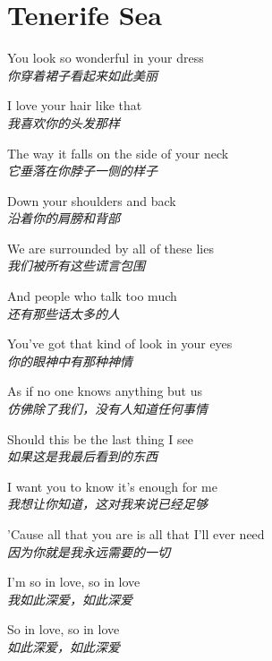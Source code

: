 \section{Tenerife Sea}

\thispagestyle{empty}


\begin{spacing}{1.5}
\begin{flushleft}
You look so wonderful in your dress\\
\textit{你穿着裙子看起来如此美丽}\lyricspace

I love your hair like that\\
\textit{我喜欢你的头发那样}\lyricspace

The way it falls on the side of your neck\\
\textit{它垂落在你脖子一侧的样子}\lyricspace

Down your shoulders and back\\
\textit{沿着你的肩膀和背部}\lyricspace

We are surrounded by all of these lies\\
\textit{我们被所有这些谎言包围}\lyricspace

And people who talk too much\\
\textit{还有那些话太多的人}\lyricspace

You've got that kind of look in your eyes\\
\textit{你的眼神中有那种神情}\lyricspace

As if no one knows anything but us\\
\textit{仿佛除了我们，没有人知道任何事情}\lyricspace

Should this be the last thing I see\\
\textit{如果这是我最后看到的东西}\lyricspace

I want you to know it's enough for me\\
\textit{我想让你知道，这对我来说已经足够}\lyricspace

'Cause all that you are is all that I'll ever need\\
\textit{因为你就是我永远需要的一切}\lyricspace

I'm so in love, so in love\\
\textit{我如此深爱，如此深爱}\lyricspace

So in love, so in love\\
\textit{如此深爱，如此深爱}\lyricspace


\end{flushleft}
\end{spacing}
